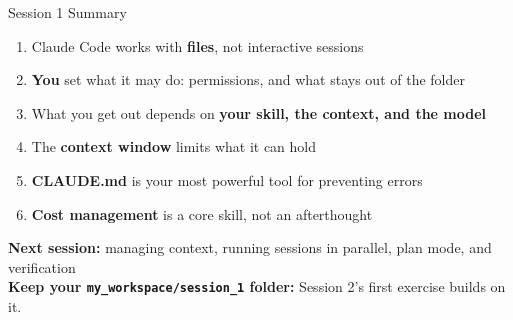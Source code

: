 \documentclass[aspectratio=169, 11pt]{beamer}
\begin{document}

\begin{frame}{Session 1 Summary}
  \begin{enumerate}
    \item Claude Code works with \textbf{files}, not interactive sessions
    \item \textbf{You} set what it may do: permissions, and what stays out of the folder
    \item What you get out depends on \textbf{your skill, the context, and the model}
    \item The \textbf{context window} limits what it can hold
    \item \textbf{CLAUDE.md} is your most powerful tool for preventing errors
    \item \textbf{Cost management} is a core skill, not an afterthought
  \end{enumerate}

  \vspace{1em}
  \centering
  \textbf{Next session:} managing context, running sessions in parallel, plan mode, and verification\\[0.3em]
  {\small \textbf{Keep your \texttt{my\_workspace/session\_1} folder:} Session 2's first exercise builds on it.}
\end{frame}
\end{document}
